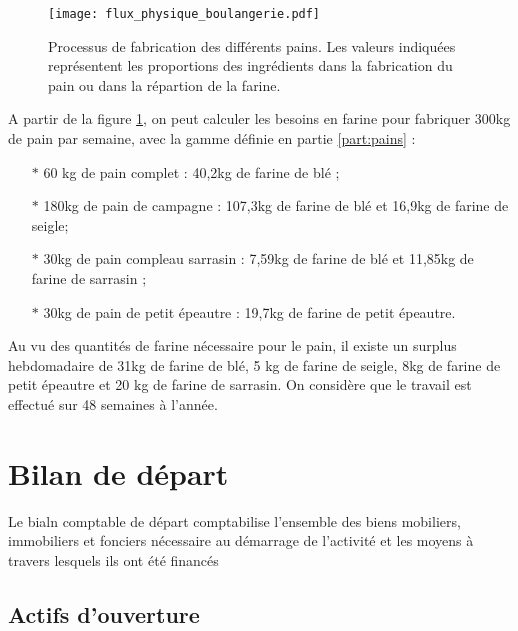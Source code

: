 \documentclass{book}
\begin{document}
\begin{figure}[h!]
\begin{center}
	\texttt{[image: flux\_physique\_boulangerie.pdf]}
	\caption{Processus de fabrication des différents pains. Les valeurs indiquées représentent les proportions des ingrédients dans la fabrication du pain ou dans la répartion de la farine.}
	\label{fig:flux_boulange}
\end{center}
\end{figure}


A partir de la figure \ref{fig:flux_boulange}, on peut calculer les besoins en farine pour fabriquer 300kg de pain par semaine, avec la gamme définie en partie \ref{part:pains} : 
\begin{itemize}

	\item[$\ast$] 60 kg de pain complet : 40,2kg de farine de blé ;
	\item[$\ast$] 180kg de pain de campagne : 107,3kg de farine de blé et 16,9kg de farine de seigle;
	\item[$\ast$] 30kg de pain compleau sarrasin : 7,59kg de farine de blé et 11,85kg de farine de sarrasin ;
	\item[$\ast$] 30kg de pain de petit épeautre : 19,7kg de farine de petit épeautre.

\end{itemize}

Au vu des quantités de farine nécessaire pour le pain, il existe un surplus hebdomadaire de 31kg de farine de blé, 5 kg de farine de seigle, 8kg de farine de petit épeautre et 20 kg de farine de sarrasin. On considère que le travail est effectué sur 48 semaines à l'année.

\section{Bilan de départ}
\label{bilan_ouverture}

Le bialn comptable de départ comptabilise l'ensemble des biens mobiliers, immobiliers et fonciers nécessaire au démarrage de l'activité et les moyens à travers lesquels ils ont été financés

\subsection{Actifs d'ouverture}
\end{document}
